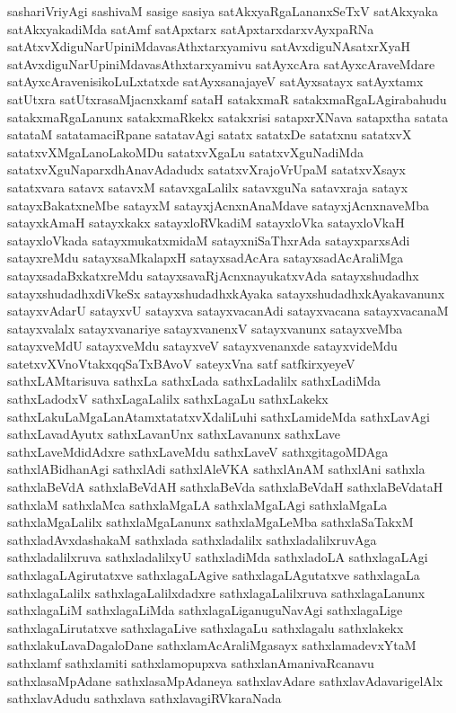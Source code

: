 {sashariVriyAgi
sashivaM
sasige
sasiya
satAkxyaRgaLananxSeTxV
satAkxyaka
satAkxyakadiMda
satAmf
satApxtarx
satApxtarxdarxvAyxpaRNa
satAtxvXdiguNarUpiniMdavasAthxtarxyamivu
satAvxdiguNAsatxrXyaH
satAvxdiguNarUpiniMdavasAthxtarxyamivu
satAyxcAra
satAyxcAraveMdare
satAyxcAravenisikoLuLxtatxde
satAyxsanajayeV
satAyxsatayx
satAyxtamx
satUtxra
satUtxrasaMjacnxkamf
sataH
satakxmaR
satakxmaRgaLAgirabahudu
satakxmaRgaLanunx
satakxmaRkekx
satakxrisi
satapxrXNava
satapxtha
satata
satataM
satatamaciRpane
satatavAgi
satatx
satatxDe
satatxnu
satatxvX
satatxvXMgaLanoLakoMDu
satatxvXgaLu
satatxvXguNadiMda
satatxvXguNaparxdhAnavAdadudx
satatxvXrajoVrUpaM
satatxvXsayx
satatxvara
satavx
satavxM
satavxgaLalilx
satavxguNa
satavxraja
satayx
satayxBakatxneMbe
satayxM
satayxjAcnxnAnaMdave
satayxjAcnxnaveMba
satayxkAmaH
satayxkakx
satayxloRVkadiM
satayxloVka
satayxloVkaH
satayxloVkada
satayxmukatxmidaM
satayxniSaThxrAda
satayxparxsAdi
satayxreMdu
satayxsaMkalapxH
satayxsadAcAra
satayxsadAcAraliMga
satayxsadaBxkatxreMdu
satayxsavaRjAcnxnayukatxvAda
satayxshudadhx
satayxshudadhxdiVkeSx
satayxshudadhxkAyaka
satayxshudadhxkAyakavanunx
satayxvAdarU
satayxvU
satayxva
satayxvacanAdi
satayxvacana
satayxvacanaM
satayxvalalx
satayxvanariye
satayxvanenxV
satayxvanunx
satayxveMba
satayxveMdU
satayxveMdu
satayxveV
satayxvenanxde
satayxvideMdu
satetxvXVnoVtakxqqSaTxBAvoV
sateyxVna
satf
satfkirxyeyeV
sathxLAMtarisuva
sathxLa
sathxLada
sathxLadalilx
sathxLadiMda
sathxLadodxV
sathxLagaLalilx
sathxLagaLu
sathxLakekx
sathxLakuLaMgaLanAtamxtatatxvXdaliLuhi
sathxLamideMda
sathxLavAgi
sathxLavadAyutx
sathxLavanUnx
sathxLavanunx
sathxLave
sathxLaveMdidAdxre
sathxLaveMdu
sathxLaveV
sathxgitagoMDAga
sathxlABidhanAgi
sathxlAdi
sathxlAleVKA
sathxlAnAM
sathxlAni
sathxla
sathxlaBeVdA
sathxlaBeVdAH
sathxlaBeVda
sathxlaBeVdaH
sathxlaBeVdataH
sathxlaM
sathxlaMca
sathxlaMgaLA
sathxlaMgaLAgi
sathxlaMgaLa
sathxlaMgaLalilx
sathxlaMgaLanunx
sathxlaMgaLeMba
sathxlaSaTakxM
sathxladAvxdashakaM
sathxlada
sathxladalilx
sathxladalilxruvAga
sathxladalilxruva
sathxladalilxyU
sathxladiMda
sathxladoLA
sathxlagaLAgi
sathxlagaLAgirutatxve
sathxlagaLAgive
sathxlagaLAgutatxve
sathxlagaLa
sathxlagaLalilx
sathxlagaLalilxdadxre
sathxlagaLalilxruva
sathxlagaLanunx
sathxlagaLiM
sathxlagaLiMda
sathxlagaLiganuguNavAgi
sathxlagaLige
sathxlagaLirutatxve
sathxlagaLive
sathxlagaLu
sathxlagalu
sathxlakekx
sathxlakuLavaDagaloDane
sathxlamAcAraliMgasayx
sathxlamadevxYtaM
sathxlamf
sathxlamiti
sathxlamopupxva
sathxlanAmanivaRcanavu
sathxlasaMpAdane
sathxlasaMpAdaneya
sathxlavAdare
sathxlavAdavarigelAlx
sathxlavAdudu
sathxlava
sathxlavagiRVkaraNada
}
